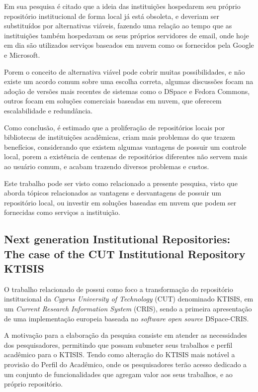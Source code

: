 Em sua pesquisa é citado que a ideia das instituições hospedarem seu próprio repositório
institucional de forma local já está obsoleta, e deveriam ser substituídos por alternativas viáveis,
fazendo uma relação ao tempo que as instituições também hospedavam os seus próprios servidores de
email, onde hoje em dia são utilizados serviços baseados em nuvem como os fornecidos pela
Google e Microsoft.

Porem o conceito de alternativa viável pode cobrir muitas possibilidades,
e não existe um acordo comum sobre uma escolha correta, algumas discussões focam na adoção de versões
mais recentes de sistemas como o DSpace e Fedora Commons, outros focam em soluções comerciais
baseadas em nuvem, que oferecem escalabilidade e redundância.

Como conclusão, é estimado que a proliferação de repositórios locais por bibliotecas de
instituições acadêmicas, criam mais problemas do que trazem benefícios, considerando
que existem algumas vantagens de possuir um controle local, porem a existência de
centenas de repositórios diferentes não servem mais ao usuário comum, e acabam trazendo
diversos problemas e custos.

Este trabalho pode ser visto como relacionado a presente pesquisa, visto que aborda
tópicos relacionados as vantagens e desvantagens de possuir um repositório local, ou
investir em soluções baseadas em nuvem que podem ser fornecidas como serviços a instituição.

\subsection{Next generation Institutional Repositories: The case of the CUT Institutional Repository KTISIS}

O trabalho relacionado de \cite{2019:Zervas} possui como foco a transformação
do repositório institucional da \emph{Cyprus University of Technology} (CUT) denominado
KTISIS, em um \emph{Current Research Information System} (CRIS), sendo a primeira
apresentação de uma implementação europeia baseada no \emph{software open source}
DSpace-CRIS.

A motivação para a elaboração da pesquisa consiste em atender as necessidades
dos pesquisadores, permitindo que possam submeter seus trabalhos e perfil acadêmico
para o KTISIS. Tendo como alteração do KTISIS mais notável a provisão do Perfil do Acadêmico,
onde os pesquisadores terão acesso dedicado a um conjunto de funcionalidades que
agregam valor aos seus trabalhos, e ao próprio repositório.

